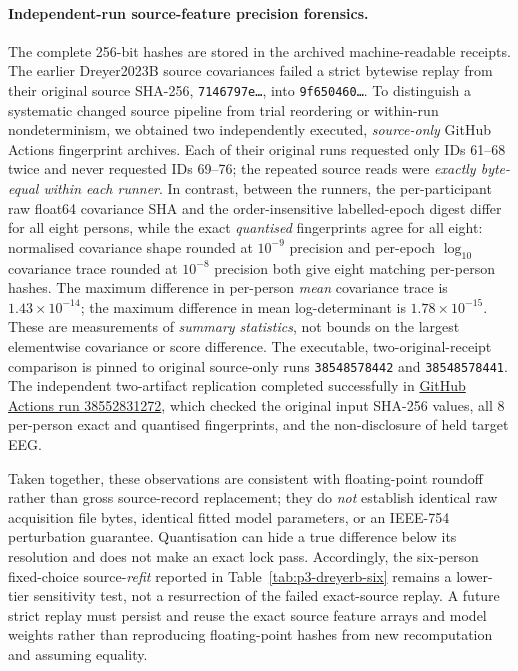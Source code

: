 \paragraph{Independent-run source-feature precision forensics.}
\label{sec:p3-dreyerb-float-fingerprints}
The complete 256-bit hashes are stored in the archived machine-readable receipts. The earlier Dreyer2023B source covariances
failed a strict bytewise replay from their
original source SHA-256,
\texttt{7146797e\ldots}, into
\texttt{9f650460\ldots}.
To distinguish a systematic changed source
pipeline from trial reordering or within-run
nondeterminism, we obtained two independently
executed, \emph{source-only} GitHub Actions
fingerprint archives. Each of their original
runs requested only IDs 61--68 twice and
never requested IDs 69--76; the repeated
source reads were \emph{exactly byte-equal
within each runner}.
In contrast, between the runners, the
per-participant raw float64 covariance SHA
and the order-insensitive labelled-epoch
digest differ for all eight persons, while
the exact \emph{quantised} fingerprints
agree for all eight: normalised covariance
shape rounded at $10^{-9}$ precision and
per-epoch $\log_{10}$ covariance trace
rounded at $10^{-8}$ precision both give
eight matching per-person hashes.
The maximum difference in per-person
\emph{mean} covariance trace is
$1.43\times10^{-14}$; the maximum difference
in mean log-determinant is
$1.78\times10^{-15}$.
These are measurements of \emph{summary
statistics}, not bounds on the largest
elementwise covariance or score difference.
The executable, two-original-receipt comparison
is pinned to original source-only runs
\texttt{38548578442} and \texttt{38548578441}.
The independent two-artifact replication completed
successfully in
\href{https://github.com/lindicaphxag-tech/kaggle/actions/runs/38552831272}
{GitHub Actions run 38552831272},
which checked the original input SHA-256 values,
all 8 per-person exact and quantised fingerprints,
and the non-disclosure of held target EEG.

Taken together, these observations are
consistent with floating-point roundoff
rather than gross source-record replacement;
they do \emph{not} establish identical raw
acquisition file bytes, identical fitted
model parameters, or an IEEE-754 perturbation
guarantee. Quantisation can hide a true
difference below its resolution and does
not make an exact lock pass. Accordingly,
the six-person fixed-choice source-\emph{refit}
reported in Table~\ref{tab:p3-dreyerb-six}
remains a lower-tier sensitivity test, not
a resurrection of the failed exact-source
replay. A future strict replay must persist
and reuse the exact source feature arrays
and model weights rather than reproducing
floating-point hashes from new recomputation
and assuming equality.
